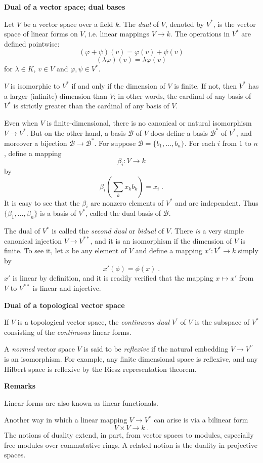 \documentclass{article}
\begin{document}
\newcommand{\B}{\mathcal{B}}
\newcommand{\Bstar}{\mathcal{B}^\ast}
\newcommand{\Vstar}{V^{\ast}}
\newcommand{\Vstarstar}{V^{\ast\ast}}

\textbf{Dual of a vector space; dual bases}

Let $V$ be a vector space over a field $k$. The \emph{dual} of $V$,
denoted by $\Vstar$, is the vector space of linear forms on $V$, i.e.
linear mappings $V\to k$.
The operations in $\Vstar$ are defined pointwise:
$$(\varphi + \psi )(v) = \varphi (v) + \psi (v) $$
$$(\lambda\varphi )(v) = \lambda\varphi (v)$$
for $\lambda\in K$, $v\in V$ and $\varphi,\psi\in\Vstar$.

$V$ is isomorphic to $\Vstar$ if and only if the dimension of
$V$ is finite. If not, then $\Vstar$ has a larger (infinite)
dimension than $V$; in other words, the cardinal of any basis
of $\Vstar$ is strictly greater than the cardinal of any basis of $V$.

Even when $V$ is finite-dimensional, there is no canonical or natural
isomorphism $V\to\Vstar$. But on the other hand, a basis
$\B$ of $V$ does define a basis $\Bstar$ of $\Vstar$, and moreover a
bijection $\B\to\Bstar$. For suppose
$\B=\{b_1,\dots,b_n\}$. For each $i$ from $1$ to $n$, define a mapping
$$\beta_i:V\to k$$
by
$$\beta_i(\sum_k x_k b_k)=x_i\;.$$
It is easy to see that the $\beta_i$ are nonzero elements of $\Vstar$
and are independent. Thus $\{\beta_1,\dots,\beta_n\}$ is a basis of
$\Vstar$, called the dual basis of $\B$.

The dual of $\Vstar$ is called the \emph{second dual} or \emph{bidual} of $V$.
There \emph{is} a very simple canonical injection $V\to\Vstarstar$,
and it is an isomorphism if the dimension of $V$ is finite.
To see it, let $x$ be any element of $V$ and define a mapping $x':\Vstar\to k$
simply by
$$x'(\phi)=\phi(x)\;.$$
$x'$ is linear by definition, and it is readily verified that the mapping
$x\mapsto x'$ from $V$ to $\Vstarstar$ is linear and injective.

\textbf{Dual of a topological vector space}

If $V$ is a topological vector space, the \emph{continuous dual}
$V^{\prime}$ of $V$ is the subspace of $\Vstar$ consisting of
the \emph{continuous} linear forms.

A \emph{normed} vector space $V$ is said to be \emph{reflexive} if the natural
embedding $V\to V^{\prime\prime}$ is an isomorphism. For example,
any finite dimensional space is reflexive, and any Hilbert space is
reflexive by the Riesz representation theorem.

\textbf{Remarks}

Linear forms are also known as linear functionals. 

Another way in which a linear mapping $V\to\Vstar$ can arise is via
a bilinear form $$V \times V \to k\;.$$
The notions of duality extend, in part, from vector spaces to modules,
especially free modules over commutative rings. A related notion is
the duality in projective spaces.
\end{document}
